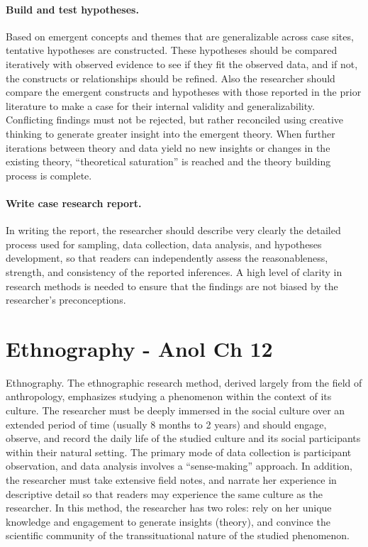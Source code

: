 \paragraph{Build and test hypotheses.} Based on emergent concepts and themes that are generalizable across case sites, tentative hypotheses are constructed. These hypotheses should be compared iteratively with observed evidence to see if they fit the observed data, and if not, the constructs or relationships should be refined. Also the researcher should compare the emergent constructs and hypotheses with those reported in the prior literature to make a case for their internal validity and generalizability. Conflicting findings must not be rejected, but rather reconciled using creative thinking to generate greater insight into the emergent theory. When further iterations between theory and data yield no new insights or changes in the existing theory, “theoretical saturation” is reached and the theory building process is complete.

\paragraph{Write case research report.} In writing the report, the researcher should describe very clearly the detailed process used for sampling, data collection, data analysis, and hypotheses development, so that readers can independently assess the reasonableness, strength, and consistency of the reported inferences. A high level of clarity in research methods is needed to ensure that the findings are not biased by the researcher’s preconceptions.

\section{Ethnography - Anol Ch 12}

Ethnography. The ethnographic research method, derived largely from the field of anthropology, emphasizes studying a phenomenon within the context of its culture. The researcher must be deeply immersed in the social culture over an extended period of time (usually 8 months to 2 years) and should engage, observe, and record the daily life of the studied culture and its social participants within their natural setting. The primary mode of data collection is participant observation, and data analysis involves a “sense-making” approach. In addition, the researcher must take extensive field notes, and narrate her experience in descriptive detail so that readers may experience the same culture as the researcher. In this method, the researcher has two roles: rely on her unique knowledge and engagement to generate insights (theory), and convince the scientific community of the transsituational nature of the studied phenomenon.

